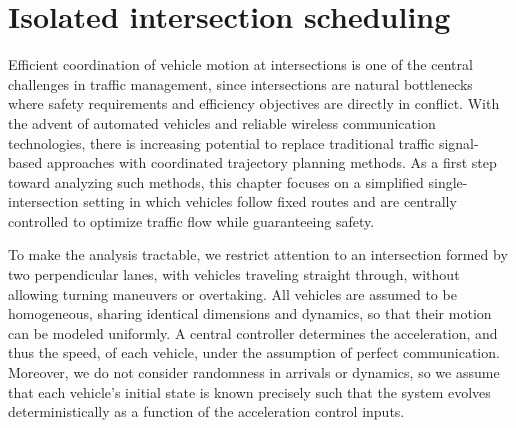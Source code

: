 \documentclass[a4paper]{report}
\theoremstyle{definition}
\theoremstyle{plain}
\begin{document}
\chapter{Isolated intersection scheduling}\label{chap:single}






Efficient coordination of vehicle motion at intersections is one of the central
challenges in traffic management, since intersections are natural bottlenecks
where safety requirements and efficiency objectives are directly in conflict.
%
With the advent of automated vehicles and reliable wireless communication
technologies, there is increasing potential to replace traditional traffic
signal-based approaches with coordinated trajectory planning methods.
%
As a first step toward analyzing such methods, this chapter focuses on a
simplified single-intersection setting in which vehicles follow fixed routes and
are centrally controlled to optimize traffic flow while guaranteeing safety.

To make the analysis tractable, we restrict attention to an intersection formed
by two perpendicular lanes, with vehicles traveling straight through, without allowing
turning maneuvers or overtaking.
%
All vehicles are assumed to be homogeneous, sharing identical dimensions and
dynamics, so that their motion can be modeled uniformly.
%
A central controller determines the acceleration, and thus the speed, of each
vehicle, under the assumption of perfect communication.
%
Moreover, we do not consider randomness in arrivals or dynamics, so we assume
that each vehicle's initial state is known precisely such that the system
evolves deterministically as a function of the acceleration control inputs.
\end{document}
